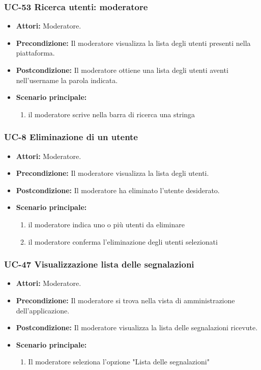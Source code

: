 \subsubsection{UC-53 Ricerca utenti: moderatore}
	\begin{itemize}
		\item \textbf{Attori:} Moderatore.
		\item \textbf{Precondizione:} Il moderatore visualizza la lista degli utenti presenti nella piattaforma.
		\item \textbf{Postcondizione:} Il moderatore ottiene una lista degli utenti aventi nell'username la parola indicata.
		\item \textbf{Scenario principale:}
			\begin{enumerate}
				\item il moderatore scrive nella barra di ricerca una stringa
			\end{enumerate}
	\end{itemize}

\subsubsection{UC-8 Eliminazione di un utente}
\begin{itemize}
	\item \textbf{Attori:} Moderatore.
	\item \textbf{Precondizione:} Il moderatore visualizza la lista degli utenti.
	\item \textbf{Postcondizione:} Il moderatore ha eliminato l'utente desiderato.
	\item \textbf{Scenario principale:}
	\begin{enumerate}
		\item il moderatore indica uno o più utenti da eliminare
		\item il moderatore conferma l'eliminazione degli utenti selezionati
	\end{enumerate}
\end{itemize}

\subsubsection{UC-47 Visualizzazione lista delle segnalazioni}
\begin{itemize}
	\item \textbf{Attori:} Moderatore.
	\item \textbf{Precondizione:} Il moderatore si trova nella vista di amministrazione dell'applicazione.
	\item \textbf{Postcondizione:} Il moderatore visualizza la lista delle segnalazioni ricevute.
	\item \textbf{Scenario principale:}
	\begin{enumerate}
		\item Il moderatore seleziona l'opzione "Lista delle segnalazioni"
	\end{enumerate}
\end{itemize}

